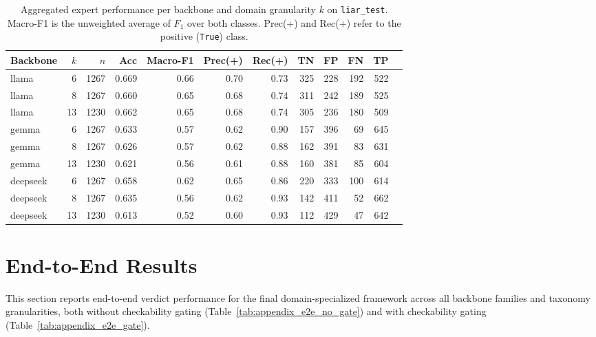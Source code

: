 \begin{landscape}
\begin{longtable}{@{}l r l r r r r r r r r r@{}}
\end{longtable}

\begin{table}[h]
\centering
\setlength{\tabcolsep}{4pt}
\renewcommand{\arraystretch}{1.05}
\caption[Aggregated expert performance per backbone and domain granularity $k$ 
on \texttt{liar\_test}.]{Aggregated expert performance per backbone and domain granularity $k$ 
on \texttt{liar\_test}. Macro-F1 is the unweighted average of $F_1$ over both 
classes. Prec(+) and Rec(+) refer to the positive (\texttt{True}) class.}
\label{tab:expert_summary}
\begin{tabular}{@{}l r r r r r r r r r r r@{}}
\toprule
Backbone & $k$ & $n$ & Acc & Macro-F1 & Prec(+) & Rec(+) & TN & FP & FN & TP\\
\midrule
llama & 6 & 1267 & 0.669 & 0.66 & 0.70 & 0.73 & 325 & 228 & 192 & 522\\
llama & 8 & 1267 & 0.660 & 0.65 & 0.68 & 0.74 & 311 & 242 & 189 & 525\\
llama & 13 & 1230 & 0.662 & 0.65 & 0.68 & 0.74 & 305 & 236 & 180 & 509\\
\midrule
gemma & 6 & 1267 & 0.633 & 0.57 & 0.62 & 0.90 & 157 & 396 & 69 & 645\\
gemma & 8 & 1267 & 0.626 & 0.57 & 0.62 & 0.88 & 162 & 391 & 83 & 631\\
gemma & 13 & 1230 & 0.621 & 0.56 & 0.61 & 0.88 & 160 & 381 & 85 & 604\\
\midrule
deepseek & 6 & 1267 & 0.658 & 0.62 & 0.65 & 0.86 & 220 & 333 & 100 & 614\\
deepseek & 8 & 1267 & 0.635 & 0.56 & 0.62 & 0.93 & 142 & 411 & 52 & 662\\
deepseek & 13 & 1230 & 0.613 & 0.52 & 0.60 & 0.93 & 112 & 429 & 47 & 642\\
\bottomrule
\end{tabular}
\end{table}

\end{landscape}

\FloatBarrier
\section{End-to-End Results}

This section reports end-to-end verdict performance for the final domain-specialized framework across all backbone families and taxonomy granularities, both without checkability gating (Table~\ref{tab:appendix_e2e_no_gate}) and with checkability gating (Table~\ref{tab:appendix_e2e_gate}).

